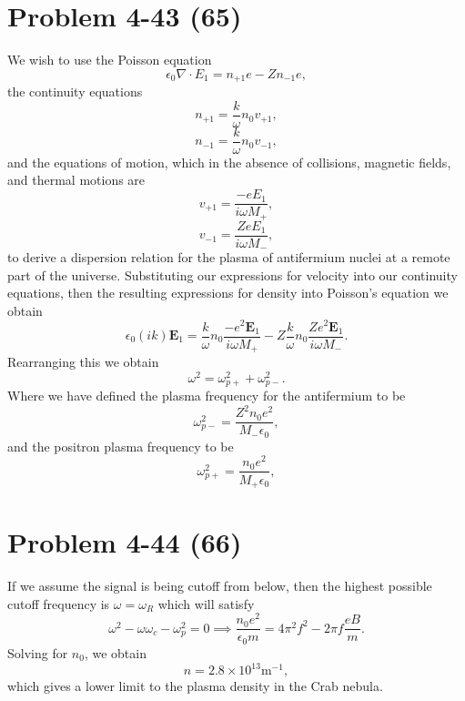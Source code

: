 \section*{Problem 4-43 (65)}
\label{sec:4-43}
We wish to use the Poisson equation
\begin{equation*}
	\epsilon_0\nabla\cdot E_1 = n_{+1}e - Zn_{-1}e,
\end{equation*}
the continuity equations
\begin{equation*}
	n_{+1} = \dfrac{k}{\omega}n_0v_{+1},
\end{equation*}
\begin{equation*}
n_{-1} = \dfrac{k}{\omega}n_0v_{-1},
\end{equation*}
and the equations of motion, which in the absence of collisions, magnetic fields, and thermal motions are 
\begin{equation*}
	v_{+1} = \dfrac{-eE_1}{i\omega M_+},
\end{equation*}
\begin{equation*}
	v_{-1} = \dfrac{ZeE_1}{i\omega M_-},
\end{equation*}
to derive a dispersion relation for the plasma of antifermium nuclei at a remote part of the universe. Substituting our expressions for velocity into our continuity equations, then the resulting expressions for density into Poisson's equation we obtain
\begin{equation*}
	\epsilon_0(ik)\bm{E}_1 = \dfrac{k}{\omega}n_0\dfrac{-e^2\bm{E}_1}{i\omega M_+} - Z\dfrac{k}{\omega}n_0\dfrac{Ze^2\bm{E}_1}{i\omega M_-}.
\end{equation*}
Rearranging this we obtain
\begin{equation*}
	\omega^2 = \omega_{p+}^2 + \omega_{p-}^2.
\end{equation*}
Where we have defined the plasma frequency for the antifermium to be 
\begin{equation*}
	\omega^2_{p-} = \dfrac{Z^2n_0e^2}{M_-\epsilon_0},
\end{equation*}
and the positron plasma frequency to be 
\begin{equation*}
	\omega^2_{p+} = \dfrac{n_0e^2}{M_+\epsilon_0},
\end{equation*}

\section*{Problem 4-44 (66)}
\label{sec:4-44}
If we assume the signal is being cutoff from below, then the highest possible cutoff frequency is \(\omega = \omega_R \) which will satisfy
\begin{equation*}
	\omega^2 - \omega\omega_c - \omega^2_p = 0 \implies \dfrac{n_0e^2}{\epsilon_0m} = 4\pi^2f^2 - 2\pi f\dfrac{eB}{m}.
\end{equation*}
Solving for \(n_0\), we obtain
\begin{equation*}
	n = 2.8\times 10^{13}\text{m}^{-1},
\end{equation*}
which gives a lower limit to the plasma density in the Crab nebula.

